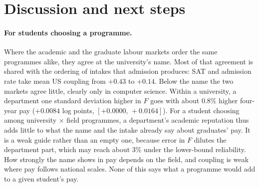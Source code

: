 \providecommand{\ci}[2]{$[#1,\allowbreak\,#2]$}

\section{Discussion and next steps}\label{sec:discussion}

\paragraph{For students choosing a programme.} Where the academic and the graduate labour markets order the same
programmes alike, they agree at the university's name. Most of that agreement is shared with the ordering of intakes
that admission produces: SAT and admission rate take mean US coupling from $+0.43$ to $+0.14$. Below the name the
two markets agree little, clearly only in computer science. Within a university, a department one standard deviation
higher in $F$ goes with about 0.8\% higher four-year pay ($+0.0084$ log points, \ci{+0.0000}{+0.0164}). For a
student choosing among university $\times$ field programmes, a department's academic reputation thus adds little to
what the name and the intake already say about graduates' pay. It is a weak guide rather than an empty one, because
error in $F$ dilutes the department part, which may reach about 3\% under the lower-bound reliability. How strongly
the name shows in pay depends on the field, and coupling is weak where pay follows national scales. None of this
says what a programme would add to a given student's pay.

